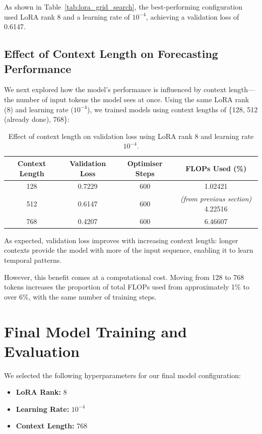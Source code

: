 \documentclass[a4paper,12pt]{article}
\begin{document}
As shown in Table~\ref{tab:lora_grid_search}, the best-performing configuration used LoRA rank 8 and a learning rate of $10^{-4}$, achieving a validation loss of 0.6147.

\subsection*{Effect of Context Length on Forecasting Performance}

We next explored how the model’s performance is influenced by context length—the number of input tokens the model sees at once. Using the same LoRA rank (8) and learning rate ($10^{-4}$), we trained models using context lengths of \{128, 512 (already done), 768\}:

\begin{table}[H]
  \centering
  \begin{tabular}{|c|c|c|c|}
    \hline
    \textbf{Context Length} & \textbf{Validation Loss} & \textbf{Optimiser Steps} & \textbf{FLOPs Used (\%)} \\
    \hline
    128 & 0.7229 & 600 & 1.02421 \\
    512 & 0.6147 & 600 & \textit{(from previous section)} 4.22516 \\
    768 & 0.4207 & 600 & 6.46607 \\
    \hline
  \end{tabular}
  \vspace{0.2cm}
  \caption{Effect of context length on validation loss using LoRA rank 8 and learning rate $10^{-4}$.}
  \label{tab:context_length_results}
\end{table}

As expected, validation loss improves with increasing context length: longer contexts provide the model with more of the input sequence, enabling it to learn temporal patterns.

However, this benefit comes at a computational cost. Moving from 128 to 768 tokens increases the proportion of total FLOPs used from approximately 1\% to over 6\%, with the same number of training steps.

\section{Final Model Training and Evaluation}

We selected the following hyperparameters for our final model configuration:
\begin{itemize}
    \item \textbf{LoRA Rank:} 8
    \item \textbf{Learning Rate:} $10^{-4}$
    \item \textbf{Context Length:} 768
\end{itemize}
\end{document}
